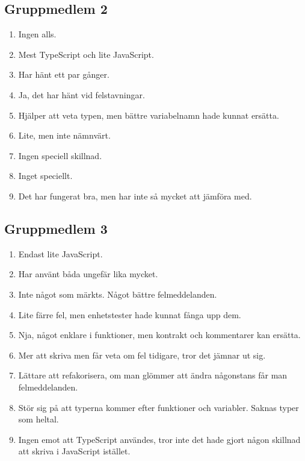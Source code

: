 \subsection{Gruppmedlem 2}
\begin{enumerate}
\item Ingen alls.
\item Mest TypeScript och lite JavaScript.
\item Har hänt ett par gånger.
\item Ja, det har hänt vid felstavningar.
\item Hjälper att veta typen, men bättre variabelnamn hade kunnat ersätta.
\item Lite, men inte nämnvärt.
\item Ingen speciell skillnad.
\item Inget speciellt.
\item Det har fungerat bra, men har inte så mycket att jämföra med.
\end{enumerate}

\subsection{Gruppmedlem 3}
\begin{enumerate}
\item Endast lite JavaScript.
\item Har använt båda ungefär lika mycket.
\item Inte något som märkts. Något bättre felmeddelanden.
\item Lite färre fel, men enhetstester hade kunnat fånga upp dem.
\item Nja, något enklare i funktioner, men kontrakt och kommentarer kan ersätta.
\item Mer att skriva men får veta om fel tidigare, tror det jämnar ut sig.
\item Lättare att refakorisera, om man glömmer att ändra  någonstans får man felmeddelanden.
\item Stör sig på att typerna kommer efter funktioner och variabler. Saknas typer som heltal.
\item Ingen emot att TypeScript användes, tror inte det hade gjort någon skillnad att skriva i JavaScript istället.
\end{enumerate}


